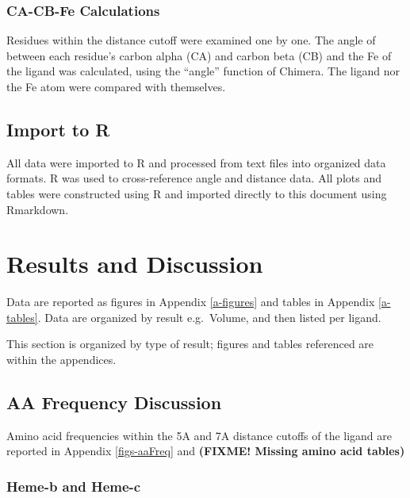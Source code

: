 \documentclass[a4paper, nobind]{templates/ociamthesis}
\begin{document}
\hypertarget{ca-cb-fe-calculations}{%
\subsection{CA-CB-Fe Calculations}\label{ca-cb-fe-calculations}}

Residues within the distance cutoff were examined one by one. The angle of between each residue's carbon alpha (CA) and carbon beta (CB) and the Fe of the ligand was calculated, using the ``angle'' function of Chimera. The ligand nor the Fe atom were compared with themselves.

\hypertarget{import-to-r}{%
\section{Import to R}\label{import-to-r}}

All data were imported to R and processed from text files into organized data formats. R was used to cross-reference angle and distance data. All plots and tables were constructed using R and imported directly to this document using Rmarkdown.

\adjustmtc
{}

\adjustmtc
{}

\hypertarget{discussion}{%
\chapter{Results and Discussion}\label{discussion}}

Data are reported as figures in Appendix \ref{a-figures} and tables in Appendix \ref{a-tables}. Data are organized by result e.g.~Volume, and then listed per ligand.

This section is organized by type of result; figures and tables referenced are within the appendices.

\hypertarget{aa-frequency-discussion}{%
\section{AA Frequency Discussion}\label{aa-frequency-discussion}}

Amino acid frequencies within the 5A and 7A distance cutoffs of the ligand are reported in Appendix \ref{figs-aaFreq} and \textbf{(FIXME! Missing amino acid tables)}

\hypertarget{heme-b-and-heme-c}{%
\subsection{Heme-b and Heme-c}\label{heme-b-and-heme-c}}
\end{document}
